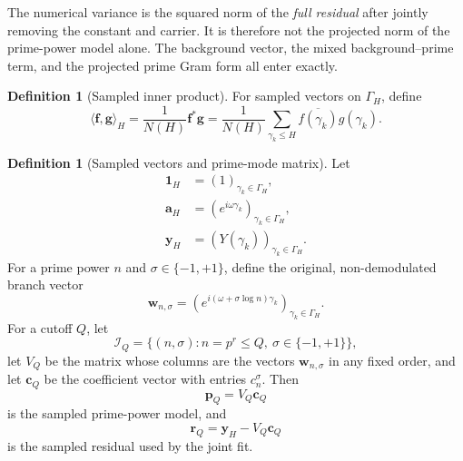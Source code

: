 \documentclass[11pt]{amsart}
\numberwithin{equation}{section}
\theoremstyle{plain}
\theoremstyle{definition}
\newtheorem{definition}[theorem]{Definition}
\theoremstyle{remark}
\newcommand{\1}{\mathbf{1}}
\begin{document}
The numerical variance is the squared norm of the \emph{full residual}
after jointly removing the constant and carrier.  It is therefore not the
projected norm of the prime-power model alone.  The background vector, the
mixed background--prime term, and the projected prime Gram form all enter
exactly.

\begin{definition}[Sampled inner product]
\label{def:sample_inner_product}
For sampled vectors on $\Gamma_H$, define
\begin{equation}
\langle \mathbf f,\mathbf g\rangle_H
=
\frac1{N(H)}\mathbf f^\ast\mathbf g
=
\frac1{N(H)}\sum_{\gamma_k\leq H}
\overline{f(\gamma_k)}g(\gamma_k).
\label{eq:sample_inner_product}
\end{equation}
\end{definition}

\begin{definition}[Sampled vectors and prime-mode matrix]
\label{def:sampled_variance_vectors}
Let
\begin{align}
\mathbf 1_H
&=
(1)_{\gamma_k\in\Gamma_H},
\label{eq:sampled_one_vector}
\\
\mathbf a_H
&=
(e^{i\omega\gamma_k})_{\gamma_k\in\Gamma_H},
\label{eq:sampled_carrier_vector}
\\
\mathbf y_H
&=
(Y(\gamma_k))_{\gamma_k\in\Gamma_H}.
\label{eq:sampled_background_vector}
\end{align}
For a prime power $n$ and $\sigma\in\{-1,+1\}$, define the original,
non-demodulated branch vector
\begin{equation}
\mathbf w_{n,\sigma}
=
\left(e^{i(\omega+\sigma\log n)\gamma_k}\right)_{\gamma_k\in\Gamma_H}.
\label{eq:original_branch_vector}
\end{equation}
For a cutoff $Q$, let
\begin{equation}
\mathcal I_Q
=
\{(n,\sigma):n=p^r\leq Q,\ \sigma\in\{-1,+1\}\},
\label{eq:branch_index_set}
\end{equation}
let $V_Q$ be the matrix whose columns are the vectors
$\mathbf w_{n,\sigma}$ in any fixed order, and let $\mathbf c_Q$ be the
coefficient vector with entries $c_n^\sigma$.  Then
\begin{equation}
\mathbf p_Q=V_Q\mathbf c_Q
\label{eq:sampled_prime_model_vector}
\end{equation}
is the sampled prime-power model, and
\begin{equation}
\mathbf r_Q=\mathbf y_H-V_Q\mathbf c_Q
\label{eq:sampled_full_residual_vector}
\end{equation}
is the sampled residual used by the joint fit.
\end{definition}
\end{document}
